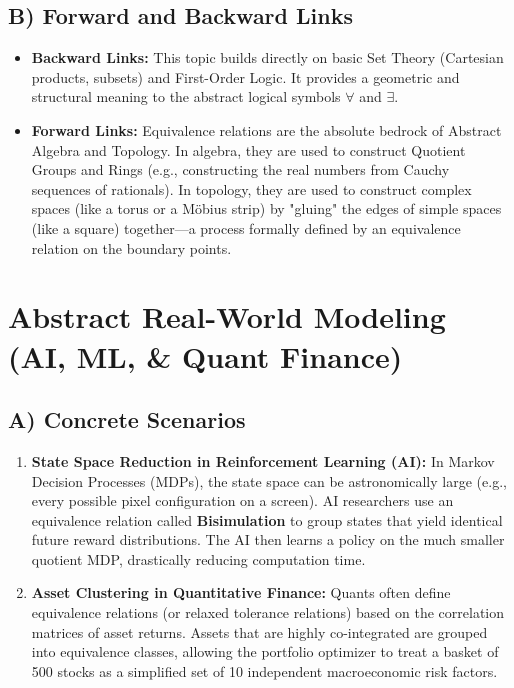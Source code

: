 \documentclass[11pt, a4paper]{article}
\theoremstyle{definition}
\theoremstyle{remark}
\begin{document}
\subsection{B) Forward and Backward Links}
\begin{itemize}
    \item \textbf{Backward Links:} This topic builds directly on basic Set Theory (Cartesian products, subsets) and First-Order Logic. It provides a geometric and structural meaning to the abstract logical symbols $\forall$ and $\exists$.
    \item \textbf{Forward Links:} Equivalence relations are the absolute bedrock of Abstract Algebra and Topology. In algebra, they are used to construct Quotient Groups and Rings (e.g., constructing the real numbers from Cauchy sequences of rationals). In topology, they are used to construct complex spaces (like a torus or a Möbius strip) by "gluing" the edges of simple spaces (like a square) together—a process formally defined by an equivalence relation on the boundary points.
\end{itemize}

\section{Abstract Real-World Modeling (AI, ML, \& Quant Finance)}

\subsection{A) Concrete Scenarios}
\begin{enumerate}
    \item \textbf{State Space Reduction in Reinforcement Learning (AI):} In Markov Decision Processes (MDPs), the state space can be astronomically large (e.g., every possible pixel configuration on a screen). AI researchers use an equivalence relation called \textbf{Bisimulation} to group states that yield identical future reward distributions. The AI then learns a policy on the much smaller quotient MDP, drastically reducing computation time.
    \item \textbf{Asset Clustering in Quantitative Finance:} Quants often define equivalence relations (or relaxed tolerance relations) based on the correlation matrices of asset returns. Assets that are highly co-integrated are grouped into equivalence classes, allowing the portfolio optimizer to treat a basket of 500 stocks as a simplified set of 10 independent macroeconomic risk factors.
\end{enumerate}
\end{document}
